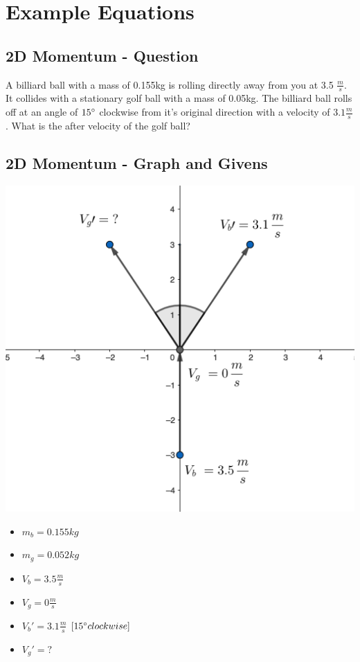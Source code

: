 \documentclass{article}
\begin{document}
\section{Example Equations}
\begin{adjustwidth}{1cm}{0pt}
    \subsection*{2D Momentum - Question}
    \begin{adjustwidth}{1cm}{0pt}
        A billiard ball with a mass of 0.155kg is rolling directly
        away from you at 3.5 $\frac{m}{s}$. It collides with a stationary golf ball with
        a mass of 0.05kg. The billiard ball rolls off at an angle of $15\degree$ clockwise
        from it's original direction with a velocity of $3.1\frac{m}{s}$. What is the after
        velocity of the golf ball?
    \end{adjustwidth}
    \subsection*{2D Momentum - Graph and Givens}
    \begin{minipage}{0.5\textwidth}
        \includegraphics[scale=0.33]{./images/2d_momentum_graph}
    \end{minipage}
    \begin{minipage}{0.5\textwidth}
        \begin{itemize}
            \item $m_{b} = 0.155kg$
            \item $m_{g} = 0.052kg$
            \item $V_{b} = 3.5\frac{m}{s}$
            \item $V_{g} = 0\frac{m}{s}$
            \item $V_{b}\prime = 3.1\frac{m}{s}$ $[15\degree clockwise]$
            \item $V_{g}\prime = ?$
        \end{itemize}
    \end{minipage}

\end{adjustwidth}
\end{document}
